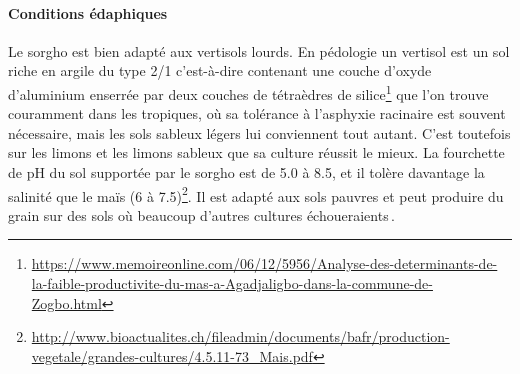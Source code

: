 \documentclass[a4paper,11pt]{article}
\begin{document}
 
\paragraph{Conditions édaphiques}
Le sorgho est bien adapté aux vertisols lourds. En pédologie un
vertisol est un sol riche en argile du type 2/1 c’est-à-dire contenant
une couche d’oxyde d’aluminium enserrée par deux couches de tétraèdres
de
silice\footnote{\url{https://www.memoireonline.com/06/12/5956/Analyse-des-determinants-de-la-faible-productivite-du-mas-a-Agadjaligbo-dans-la-commune-de-Zogbo.html}}
que l’on trouve couramment dans les tropiques, où sa tolérance à
l’asphyxie racinaire est souvent nécessaire, mais les sols sableux
légers lui conviennent tout autant. C’est toutefois sur les limons et
les limons sableux que sa culture réussit le mieux. La fourchette de
pH du sol supportée par le sorgho est de 5.0 à 8.5, et il tolère
davantage la salinité que le maïs (6 à
7.5)\footnote{\url{http://www.bioactualites.ch/fileadmin/documents/bafr/production-vegetale/grandes-cultures/4.5.11-73_Mais.pdf}}. Il
est adapté aux sols pauvres et peut produire du grain sur des sols où
beaucoup d’autres cultures échoueraients\,\cite{BARRO_KONDOMBO_2010}.
 
 
\end{document}
